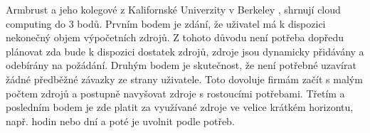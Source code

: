     Armbrust a jeho kolegové z Kalifornské Univerzity v Berkeley \cite{Ambrust2009}, shrnují cloud computing do 3 bodů. Prvním bodem je zdání, že uživatel má k dispozici nekonečný objem výpočetních zdrojů. Z tohoto důvodu není potřeba dopředu plánovat zda bude k dispozici dostatek zdrojů, zdroje jsou dynamicky přidávány a odebírány na požádání. Druhým bodem je skutečnost, že není potřebné uzavírat žádné předběžné závazky ze strany uživatele. Toto dovoluje firmám začít s malým počtem zdrojů a postupně navyšovat zdroje s rostoucími potřebami. Třetím a posledním bodem je zde platit za využívané zdroje ve velice krátkém horizontu, např. hodin nebo dní a poté je uvolnit podle potřeb.


